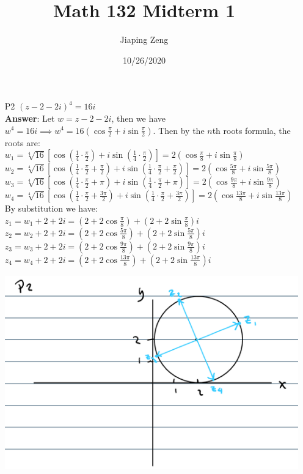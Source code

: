 \documentclass{article}
\title{Math 132 Midterm 1}
\author{Jiaping Zeng}
\date{10/26/2020}
\begin{document}

\newpage
\begin{itemize}
    \item [P2] $(z-2-2i)^4=16i$\\
          \textbf{Answer}: Let $w=z-2-2i$, then we have $w^4=16i\implies w^4=16(\cos\frac{\pi}{2}+i\sin\frac{\pi}{2})$. Then by the $n$th roots formula, the roots are:\\
          $w_1=\sqrt[4]{16}\left[\cos(\frac{1}{4}\cdot\frac{\pi}{2})+i\sin(\frac{1}{4}\cdot\frac{\pi}{2})\right]=2(\cos\frac{\pi}{8}+i\sin\frac{\pi}{8})$\\
          $w_2=\sqrt[4]{16}\left[\cos(\frac{1}{4}\cdot\frac{\pi}{2}+\frac{\pi}{2})+i\sin(\frac{1}{4}\cdot\frac{\pi}{2}+\frac{\pi}{2})\right]=2(\cos\frac{5\pi}{8}+i\sin\frac{5\pi}{8})$\\
          $w_3=\sqrt[4]{16}\left[\cos(\frac{1}{4}\cdot\frac{\pi}{2}+\pi)+i\sin(\frac{1}{4}\cdot\frac{\pi}{2}+\pi)\right]=2(\cos\frac{9\pi}{8}+i\sin\frac{9\pi}{8})$\\
          $w_4=\sqrt[4]{16}\left[\cos(\frac{1}{4}\cdot\frac{\pi}{2}+\frac{3\pi}{2})+i\sin(\frac{1}{4}\cdot\frac{\pi}{2}+\frac{3\pi}{2})\right]=2(\cos\frac{13\pi}{8}+i\sin\frac{13\pi}{8})$\\
          By substitution we have:\\
          $z_1=w_1+2+2i=(2+2\cos\frac{\pi}{8})+(2+2\sin\frac{\pi}{8})i$\\
          $z_2=w_2+2+2i=(2+2\cos\frac{5\pi}{8})+(2+2\sin\frac{5\pi}{8})i$\\
          $z_3=w_3+2+2i=(2+2\cos\frac{9\pi}{8})+(2+2\sin\frac{9\pi}{8})i$\\
          $z_4=w_4+2+2i=(2+2\cos\frac{13\pi}{8})+(2+2\sin\frac{13\pi}{8})i$
          \begin{center}
              \includegraphics[width=6in]{p2.png}
          \end{center}
\end{itemize}
\end{document}
